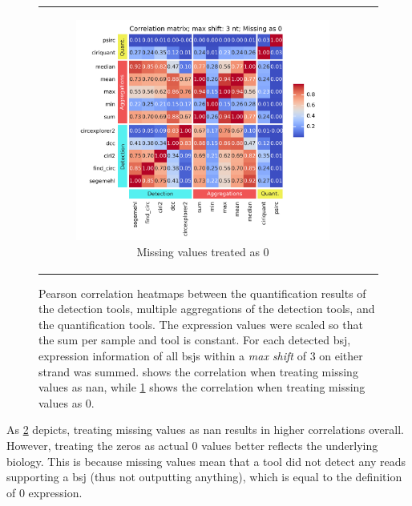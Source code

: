 \begin{figure}[ht]
\begin{tabular}{cc}
\begin{subfigure}{0.5\textwidth}
            \includegraphics[width=\linewidth]{chapters/4_results_and_discussion/figures/quantification/correlation_heatmap_3_0.png}
            \caption{Missing values treated as 0}
            \label{fig:correlation_heatmap_3_0}
        \end{subfigure} \end{tabular} \caption{Pearson correlation heatmaps
        between the quantification results of the detection tools, multiple
        aggregations of the detection tools, and the quantification tools.
        The expression values were scaled so that the sum per sample and tool is
        constant.
        For each detected \gls{bsj}, expression information of all \glspl{bsj} within a
        \textit{max shift} of 3 on either strand was summed.
         shows the correlation when treating
        missing values as \gls{nan}, while \cref{fig:correlation_heatmap_3_0}
        shows
        the
        correlation when treating missing values as 0.
    } \label{fig:correlation_heatmap} \end{figure}

As \cref{fig:correlation_heatmap} depicts, treating missing values as \gls{nan}
results in higher correlations overall.
However, treating the zeros as actual 0 values better reflects the underlying
biology.
This is because missing values mean that a tool did not detect any reads
supporting a \gls{bsj} (thus not outputting anything), which is equal to the
definition of 0 expression.

